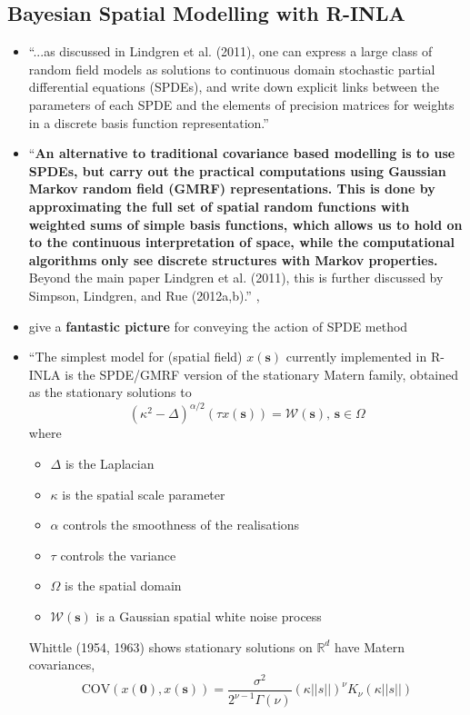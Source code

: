 \documentclass{article}
\begin{document}
\subsection*{Bayesian Spatial Modelling with R-INLA \citep{Lindgren2015}}
\begin{itemize}
\item ``...as discussed in Lindgren et al. (2011), one can express a large class of random field models as solutions to continuous domain stochastic partial differential equations (SPDEs), and write down explicit links between the parameters of each SPDE and the elements of precision matrices for weights in a discrete basis function representation.''
\item ``{\bf An alternative to traditional covariance based modelling is to use SPDEs, but carry out the practical computations using Gaussian Markov random field (GMRF) representations. This is done by approximating the full set of spatial random functions with weighted sums of simple basis functions, which allows us to hold on to the continuous interpretation of space, while the computational algorithms only see discrete structures with Markov properties.} Beyond the main paper Lindgren et al. (2011), this is further discussed by Simpson, Lindgren, and Rue (2012a,b).'' \citep{Simpson2012}, \citep{Simpson2012b}
\item \cite{Simpson2012} give a {\bf fantastic picture} for conveying the action of SPDE method
\item ``The simplest model for (spatial field) $x(\pmb{s})$ currently implemented in R-INLA is the SPDE/GMRF version of the stationary Matern family, obtained as the stationary solutions to
$$ (\kappa^{2} - \Delta)^{\alpha/2}(\tau x(\pmb{s})) = \mathcal{W}(\pmb{s})\text{, } \pmb{s} \in \Omega $$ where
    \begin{itemize}
    \item $\Delta$ is the Laplacian
    \item $\kappa$ is the spatial scale parameter
    \item $\alpha$ controls the smoothness of the realisations
    \item $\tau$ controls the variance
    \item $\Omega$ is the spatial domain
    \item $\mathcal{W}(\pmb{s})$ is a Gaussian spatial white noise process
    \end{itemize}
Whittle (1954, 1963) shows stationary solutions on $\mathbb{R}^{d}$ have Matern covariances,
$$\text{COV}(x(\pmb{0}), x(\pmb{s})) = \frac{\sigma^{2}}{2^{\nu - 1}\Gamma(\nu)}(\kappa||s||)^{\nu}K_{\nu}(\kappa||s||)$$

\end{itemize}
\end{document}
